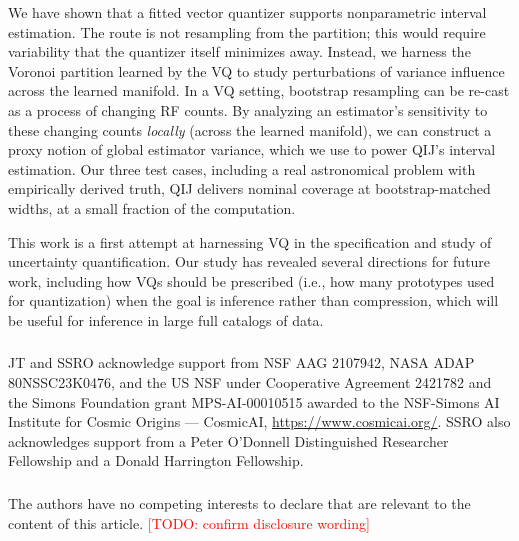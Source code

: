 \documentclass[runningheads]{llncs}
\newcommand{\todo}[1]{\textcolor{red}{[TODO: #1]}}
\begin{document}
We have shown that a fitted vector quantizer supports nonparametric interval estimation. The route is not resampling from the partition; this would require variability that the quantizer itself minimizes away. Instead, we harness the Voronoi partition learned by the VQ to study perturbations of variance influence across the learned manifold. In a VQ setting, bootstrap resampling can be re-cast as a process of changing RF counts. By analyzing an estimator's sensitivity to these changing counts \textit{locally} (across the learned manifold), we can construct a proxy notion of global estimator variance, which we use to power QIJ's interval estimation. Our three test cases, including a real astronomical problem with empirically derived truth, QIJ delivers nominal coverage at bootstrap-matched widths, at a small fraction of the computation.

This work is a first attempt at harnessing VQ in the specification and study of uncertainty quantification. Our study has revealed several directions for future work, including how VQs should be prescribed (i.e., how many prototypes used for quantization) when the goal is inference rather than compression, which will be useful for inference in large full catalogs of data.

\begin{credits}
\subsubsection{\ackname} JT and SSRO acknowledge support from NSF AAG 2107942, NASA ADAP 80NSSC23K0476, and the US NSF under Cooperative Agreement 2421782 and the Simons Foundation grant MPS-AI-00010515 awarded to the NSF-Simons AI Institute for Cosmic Origins --- CosmicAI, \url{https://www.cosmicai.org/}. SSRO also acknowledges support from a Peter O'Donnell Distinguished Researcher Fellowship and a Donald Harrington Fellowship.
\subsubsection{\discintname} The authors have no competing interests to declare that are relevant to the content of this article. \todo{confirm disclosure wording}
\end{credits}



\end{document}
